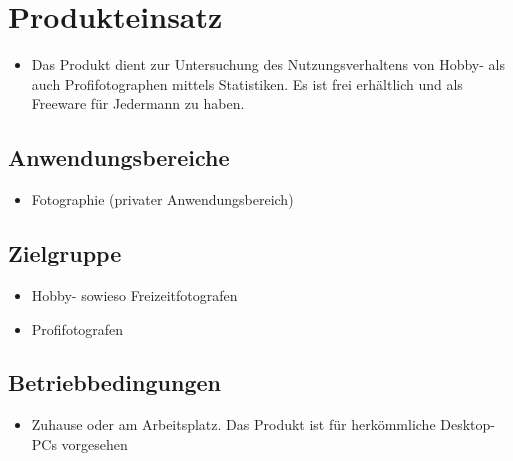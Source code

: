 \section{Produkteinsatz}
  \begin{itemize}
  \item Das Produkt dient zur Untersuchung des Nutzungsverhaltens von Hobby- als auch Profifotographen mittels Statistiken. Es ist frei erhältlich und als Freeware für Jedermann zu haben.
  \end{itemize}
\subsection{Anwendungsbereiche}
  \begin{itemize}
  \item Fotographie (privater Anwendungsbereich) 
  \end{itemize}

\subsection{Zielgruppe}
	\begin{itemize}
		\item Hobby- sowieso Freizeitfotografen
		\item Profifotografen		
	\end{itemize}

\subsection{Betriebbedingungen}
  \begin{itemize}
  		\item Zuhause oder am Arbeitsplatz. Das Produkt ist für herkömmliche Desktop-PCs vorgesehen
  \end{itemize}
